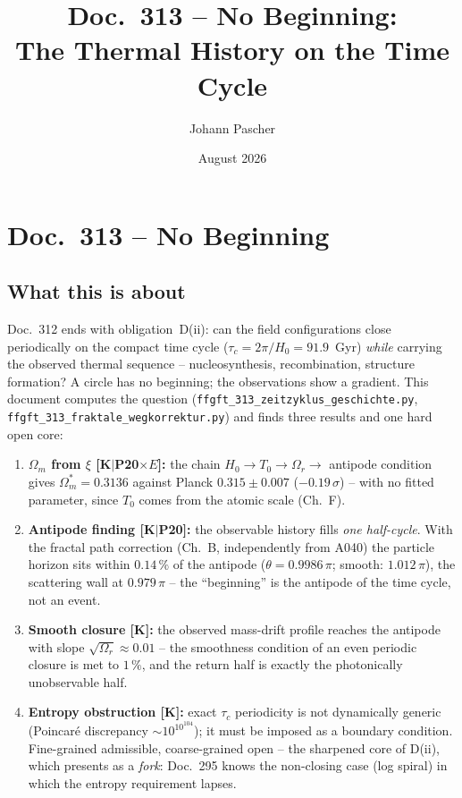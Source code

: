 \documentclass[11pt]{report}
\title{Doc.~313 -- No Beginning:\\
The Thermal History on the Time Cycle}
\author{Johann Pascher}
\date{August 2026}
\begin{document}
\maketitle
\tableofcontents

\chapter*{Doc.~313 -- No Beginning}

\section*{What this is about}

Doc.~312 ends with obligation~D(ii): can the field configurations
close periodically on the compact time cycle
($\tau_c = 2\pi/H_0 = 91.9$~Gyr) \emph{while} carrying the observed
thermal sequence -- nucleosynthesis, recombination, structure
formation? A circle has no beginning; the observations show a
gradient. This document computes the question
(\texttt{ffgft\_313\_zeitzyklus\_geschichte.py},
\texttt{ffgft\_313\_fraktale\_wegkorrektur.py}) and finds three
results and one hard open core:

\begin{enumerate}
  \item \textbf{$\Omega_m$ from $\xi$ [K$|$P20$\times E$]:} the
        chain $H_0 \to T_0 \to \Omega_r \to$ antipode condition
        gives $\Omega_m^{*} = 0.3136$ against Planck
        $0.315\pm0.007$ ($-0.19\,\sigma$) -- with no fitted
        parameter, since $T_0$ comes from the atomic scale
        (Ch.~F).
  \item \textbf{Antipode finding [K$|$P20]:} the observable
        history fills \emph{one half-cycle}. With the fractal
        path correction (Ch.~B, independently from A040) the
        particle horizon sits within $0.14\,\%$ of the antipode
        ($\theta = 0.9986\,\pi$; smooth: $1.012\,\pi$), the
        scattering wall at $0.979\,\pi$ -- the
        \enquote{beginning} is the antipode of the time cycle,
        not an event.
  \item \textbf{Smooth closure [K]:} the observed mass-drift
        profile reaches the antipode with slope
        $\sqrt{\Omega_r} \approx 0.01$ -- the smoothness condition
        of an even periodic closure is met to $1\,\%$, and the
        return half is exactly the photonically unobservable half.
  \item \textbf{Entropy obstruction [K]:} exact $\tau_c$
        periodicity is not dynamically generic (Poincaré
        discrepancy $\sim 10^{10^{104}}$); it must be imposed as a
        boundary condition. Fine-grained admissible,
        coarse-grained open -- the sharpened core of D(ii), which
        presents as a \emph{fork}: Doc.~295 knows the
        non-closing case (log spiral) in which the entropy
        requirement lapses.
\end{enumerate}
\end{document}
